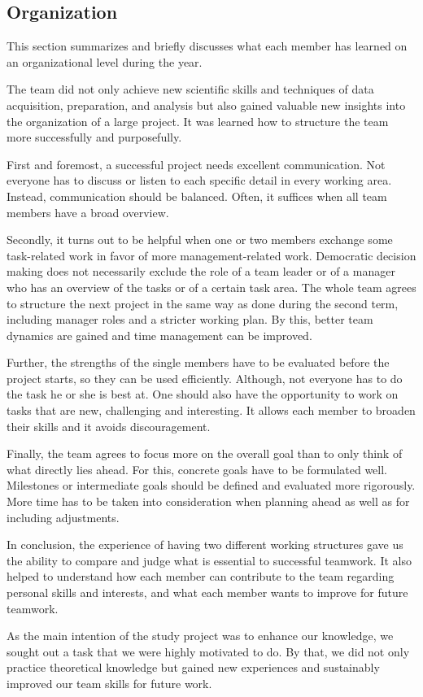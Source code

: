 \subsection{Organization}
\label{sec:DiscussionOrganization}

This section summarizes and briefly discusses what each member has learned on an organizational level during the year.

The team did not only achieve new scientific skills and techniques of data acquisition, preparation, and analysis but also gained valuable new insights into the organization of a large project. It was learned how to structure the team more successfully and purposefully.

\bigskip
First and foremost, a successful project needs excellent communication. Not everyone has to discuss or listen to each specific detail in every working area. Instead, communication should be balanced. Often, it suffices when all team members have a broad overview.

Secondly, it turns out to be helpful when one or two members exchange some task-related work in favor of more management-related work. Democratic decision making does not necessarily exclude the role of a team leader or of a manager who has an overview of the tasks or of a certain task area. The whole team agrees to structure the next project in the same way as done during the second term, including manager roles and a stricter working plan. By this, better team dynamics are gained and time management can be improved.

Further, the strengths of the single members have to be evaluated before the project starts, so they can be used efficiently. Although, not everyone has to do the task he or she is best at. One should also have the opportunity to work on tasks that are new, challenging and interesting. It allows each member to broaden their skills and it avoids discouragement. 

Finally, the team agrees to focus more on the overall goal than to only think of what directly lies ahead. For this, concrete goals have to be formulated well. Milestones or intermediate goals should be defined and evaluated more rigorously. More time has to be taken into consideration when planning ahead as well as for including adjustments.

\bigskip
In conclusion, the experience of having two different working structures gave us the ability to compare and judge what is essential to successful teamwork. It also helped to understand how each member can contribute to the team regarding personal skills and interests, and what each member wants to improve for future teamwork.

As the main intention of the study project was to enhance our knowledge, we sought out a task that we were highly motivated to do. By that, we did not only practice theoretical knowledge but gained new experiences and sustainably improved our team skills for future work.